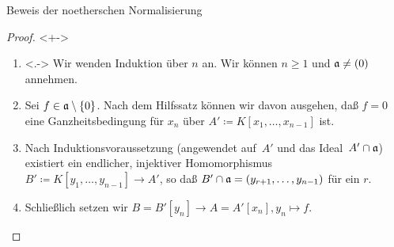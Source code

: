 \begin{frame}{Beweis der noetherschen Normalisierung}
	\begin{proof}<+->
		\begin{enumerate}[<+->]
		\item<.->
			Wir wenden Induktion über \(n\) an. Wir können \(n \ge 1\) und \(\mathfrak{a} \neq (0)\) annehmen.
		\item
			Sei \(f \in \mathfrak{a} \setminus \{0\}\). Nach dem Hilfssatz können wir
			davon ausgehen, daß \(f = 0\) eine
			Ganzheitsbedingung für \(x_n\) über \(A' \coloneqq K[x_1, \dotsc, x_{n - 1}]\) ist.
		\item
			Nach Induktionsvoraussetzung (angewendet auf~$A'$ und das Ideal~$A' \cap \mathfrak{a}$) existiert ein endlicher, injektiver Homomorphismus \(B' \coloneqq K[y_1, \dotsc,
			y_{n - 1}] \to A'\), so daß \(B' \cap \mathfrak{a} = (y_{r + 1}, \dotsc, y_{n-1})\) für ein \(r\). 
		\item
			Schließlich setzen wir \(B = B'[y_n] \to A = A'[x_n], y_n \mapsto f\).
			\qedhere
		\end{enumerate}
	\end{proof}
\end{frame}


